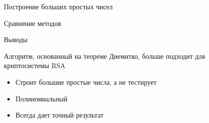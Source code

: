 \begin{frame}{Построение больших простых чисел}
		\begin{center}
			\begin{block}{Сравнение методов}
			\centering
		\end{block} \vspace{0.3cm}

		{\LARGE Выводы } \vspace{0.3cm}

		Алгоритм, основанный на теореме Диемитко, больше подходит для криптосистемы RSA

		\begin{itemize}
			\item Строит большие простые числа, а не тестирует
			\item Полиномиальный
			\item Всегда дает точный результат
		\end{itemize}
	\end{center}	
\end{frame}

